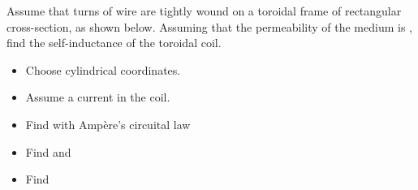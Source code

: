 \begin{ELexample}{}

Assume that  turns of wire are tightly wound on a toroidal frame of rectangular cross-section, as shown below. Assuming that the permeability of the medium is , find the self-inductance of the toroidal coil.


\begin{ELsolution}

\begin{itemize}
\tightlist
\item
  Choose cylindrical coordinates.
\item
  Assume a current  in the coil.
\item
  Find  with Ampère's circuital law
\end{itemize}


\begin{itemize}
\tightlist
\item
  Find \ELim{\Phi} and \ELim{\Lambda}
\end{itemize}


\begin{itemize}
\tightlist
\item
  Find 
\end{itemize}


\end{ELsolution}

\end{ELexample}


